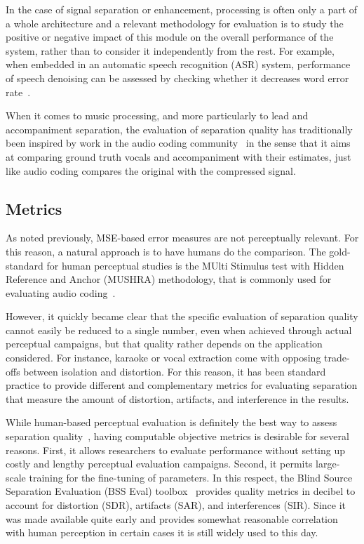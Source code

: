 In the case of signal separation or enhancement, processing is often only a part of a whole architecture and a relevant methodology for evaluation is to study the positive or negative impact of this module on the overall performance of the system, rather than to consider it independently from the rest. For example, when embedded in an automatic speech recognition (ASR) system, performance of speech denoising can be assessed by checking whether it decreases word error rate~\cite{barker15}.

When it comes to music processing, and more particularly to lead and accompaniment separation, the evaluation of separation quality has traditionally been inspired by work in the audio coding community~\cite{recommendation2001MUSHRA,rix01} in the sense that it aims at comparing ground truth vocals and accompaniment with their estimates, just like audio coding compares the original with the compressed signal.

\subsection{Metrics}
\label{ssec:metrics}

As noted previously, MSE-based error measures are not perceptually relevant. For this reason, a natural approach is to have humans do the comparison. The gold-standard for human perceptual studies is the MUlti Stimulus test with Hidden Reference and Anchor (MUSHRA) methodology, that is commonly used for evaluating audio coding~\cite{recommendation2001MUSHRA}.

However, it quickly became clear that the specific evaluation of separation quality cannot easily be reduced to a single number, even when achieved through actual perceptual campaigns, but that quality rather depends on the application considered. For instance, karaoke or vocal extraction come with opposing trade-offs between isolation and distortion. For this reason, it has been standard practice to provide different and complementary metrics for evaluating separation that measure the amount of distortion, artifacts, and interference in the results.

While human-based perceptual evaluation is definitely the best way to assess separation quality~\cite{vincent062,cano11}, having computable objective metrics is desirable for several reasons. First, it allows researchers to evaluate performance without setting up costly and lengthy perceptual evaluation campaigns. Second, it permits large-scale training for the fine-tuning of parameters. In this respect, the Blind Source Separation Evaluation (BSS Eval) toolbox~\cite{fevotte05a,vincent06} provides quality metrics in decibel to account for distortion (SDR), artifacts (SAR), and interferences (SIR). Since it was made available quite early and provides somewhat reasonable correlation with human perception in certain cases \cite{fox07,fox072} it is still widely used to this day.

